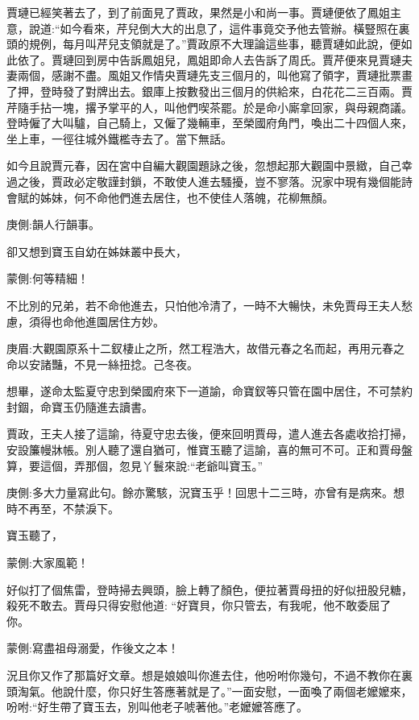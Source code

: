 \begin{parag}
    賈璉已經笑著去了，到了前面見了賈政，果然是小和尚一事。賈璉便依了鳳姐主意，說道:“如今看來，芹兒倒大大的出息了，這件事竟交予他去管辦。橫豎照在裏頭的規例，每月叫芹兒支領就是了。”賈政原不大理論這些事，聽賈璉如此說，便如此依了。賈璉回到房中告訴鳳姐兒，鳳姐即命人去告訴了周氏。賈芹便來見賈璉夫妻兩個，感謝不盡。風姐又作情央賈璉先支三個月的，叫他寫了領字，賈璉批票畫了押，登時發了對牌出去。銀庫上按數發出三個月的供給來，白花花二三百兩。賈芹隨手拈一塊，撂予掌平的人，叫他們喫茶罷。於是命小廝拿回家，與母親商議。登時僱了大叫驢，自己騎上，又僱了幾輛車，至榮國府角門，喚出二十四個人來，坐上車，一徑往城外鐵檻寺去了。當下無話。
\end{parag}


\begin{parag}
    如今且說賈元春，因在宮中自編大觀園題詠之後，忽想起那大觀園中景緻，自己幸過之後，賈政必定敬謹封鎖，不敢使人進去騷擾，豈不寥落。況家中現有幾個能詩會賦的姊妹，何不命他們進去居住，也不使佳人落魄，花柳無顏。\begin{note}庚側:韻人行韻事。\end{note}卻又想到寶玉自幼在姊妹叢中長大，\begin{note}蒙側:何等精細！\end{note}不比別的兄弟，若不命他進去，只怕他冷清了，一時不大暢快，未免賈母王夫人愁慮，須得也命他進園居住方妙。\begin{note}庚眉:大觀園原系十二釵棲止之所，然工程浩大，故借元春之名而起，再用元春之命以安諸豔，不見一絲扭捻。己冬夜。\end{note}想畢，遂命太監夏守忠到榮國府來下一道諭，命寶釵等只管在園中居住，不可禁約封錮，命寶玉仍隨進去讀書。
\end{parag}


\begin{parag}
    賈政，王夫人接了這諭，待夏守忠去後，便來回明賈母，遣人進去各處收拾打掃，安設簾幔牀帳。別人聽了還自猶可，惟寶玉聽了這諭，喜的無可不可。正和賈母盤算，要這個，弄那個，忽見丫鬟來說:“老爺叫寶玉。”\begin{note}庚側:多大力量寫此句。餘亦驚駭，況寶玉乎！回思十二三時，亦曾有是病來。想時不再至，不禁淚下。\end{note}寶玉聽了，\begin{note}蒙側:大家風範！\end{note}好似打了個焦雷，登時掃去興頭，臉上轉了顏色，便拉著賈母扭的好似扭股兒糖，殺死不敢去。賈母只得安慰他道: “好寶貝，你只管去，有我呢，他不敢委屈了你。\begin{note}蒙側:寫盡祖母溺愛，作後文之本！\end{note}況且你又作了那篇好文章。想是娘娘叫你進去住，他吩咐你幾句，不過不教你在裏頭淘氣。他說什麼，你只好生答應著就是了。”一面安慰，一面喚了兩個老嬤嬤來，吩咐:“好生帶了寶玉去，別叫他老子唬著他。”老嬤嬤答應了。
\end{parag}



